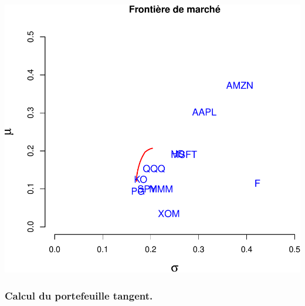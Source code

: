 \documentclass[
]{article}
\begin{document}
\includegraphics{TP-2_files/figure-latex/unnamed-chunk-18-1.pdf}

\hypertarget{calcul-du-portefeuille-tangent.-1}{%
\subsubsection{Calcul du portefeuille
tangent.}\label{calcul-du-portefeuille-tangent.-1}}
\end{document}
